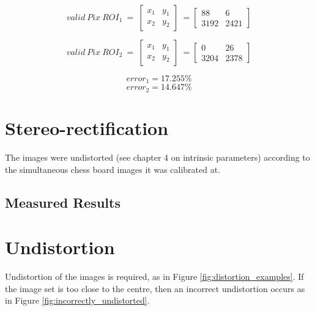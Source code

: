 \begin{equation}\label{eq::validpix1}
valid\ Pix\ ROI_1\ =\ 
\begin{bmatrix}
x_1 & y_1\\
x_2 & y_2
\end{bmatrix}\ =
\begin{bmatrix}
88 & 6\\
3192 & 2421
\end{bmatrix}
\end{equation}

\begin{equation}\label{eq::validpix2}
valid\ Pix\ ROI_2\ =\ 
\begin{bmatrix}
x_1 & y_1\\
x_2 & y_2
\end{bmatrix}\ =
\begin{bmatrix}
0 & 26\\
3204 & 2378
\end{bmatrix}
\end{equation}

\begin{equation}\label{eq::error1}
error_1 = 17.255\%
\end{equation}
\begin{equation}\label{eq::error2}
error_2 = 14.647\%
\end{equation}

\section{Stereo-rectification}

The images were undistorted (see chapter 4 on intrinsic parameters) according to the simultaneous chess board images it was calibrated at.

\subsection{Measured Results}

\section{Undistortion}
\label{sec:undistortion}

Undistortion of the images is required, as in Figure \ref{fig:distortion_examples}. If the image set is too close to the centre, then an incorrect undistortion occurs as in Figure \ref{fig:incorrectly_undistorted}.


